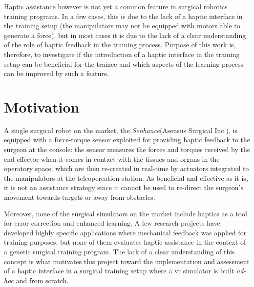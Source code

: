 \documentclass[../main.tex]{subfiles}
\begin{document}
Haptic assistance however is not yet a common feature in surgical robotics training programs. In a few cases, this is due to the lack of a haptic interface in the training setup (the manipulators may not be equipped with motors able to generate a force), but in most cases it is due to the lack of a clear understanding of the role of haptic feedback in the training process. Purpose of this work is, therefore, to investigate if the introduction of a haptic interface in the training setup can be beneficial for the trainee and which aspects of the learning process can be improved by such a feature.
\section{Motivation}
A single surgical robot on the market, the \textit{Senhance}\cright (Asensus Surgical Inc.), is equipped with a force-torque sensor exploited for providing haptic feedback to the surgeon at the console: the sensor measures the forces and torques received by the end-effector when it comes in contact with the tissues and organs in the operatory space, which are then re-created in real-time by actuators integrated to the manipulators at the teleopereation station. As beneficial and effective as it is, it is not an assistance strategy since it cannot be used to re-direct the surgeon's movement towards targets or away from obstacles.

Moreover, none of the surgical simulators on the market include haptics as a tool for error correction and enhanced learning. A few research projects have developed highly specific applications where mechanical feedback was applied for training purposes, but none of them evaluates haptic assistance in the context of a generic surgical training program. The lack of a clear understanding of this concept is what motivates this project toward the implementation and assessment of a haptic interface in a surgical training setup where a \ac{vr} simulator is built \textit{ad-hoc} and from scratch.

% 
% 
\end{document}
